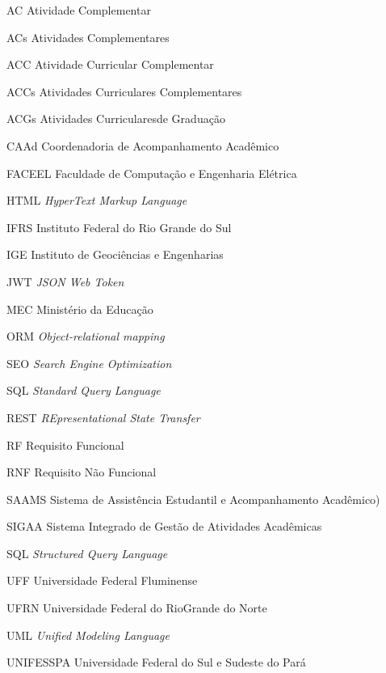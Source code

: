 
\begin{siglas} 
    \item [AC] Atividade Complementar
    \item [ACs] Atividades Complementares
    \item [ACC] Atividade Curricular Complementar
    \item [ACCs] Atividades Curriculares Complementares
    \item [ACGs] Atividades Curricularesde Graduação
    \item [CAAd] Coordenadoria de Acompanhamento Acadêmico
    \item [FACEEL] Faculdade de Computação e Engenharia Elétrica
    \item [HTML] \textit{HyperText Markup Language}
    \item [IFRS] Instituto  Federal  do  Rio  Grande  do  Sul
    \item [IGE] Instituto de Geociências e Engenharias
    \item [JWT] \textit{JSON Web Token}
    \item [MEC] Ministério da Educação
    \item [ORM] \textit{Object-relational mapping}
    \item [SEO] \textit{Search Engine Optimization}
    \item [SQL] \textit{Standard Query Language}
    \item [REST] \textit{REpresentational State Transfer}
    \item [RF] Requisito Funcional
    \item [RNF] Requisito Não Funcional
    \item [SAAMS] Sistema  de  Assistência  Estudantil  e  Acompanhamento  Acadêmico)
    \item [SIGAA] Sistema Integrado de Gestão de Atividades Acadêmicas
    \item [SQL] \textit{Structured Query Language}
    \item [UFF] Universidade Federal Fluminense
    \item [UFRN] Universidade Federal do RioGrande  do  Norte
    \item [UML] \textit{Unified Modeling Language}
    \item [UNIFESSPA] Universidade Federal do Sul e Sudeste do Pará
    
\end{siglas}

